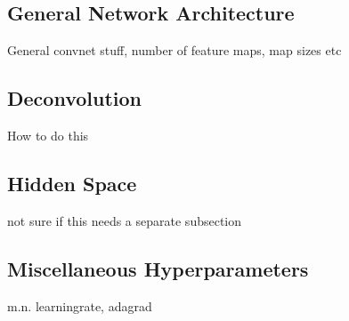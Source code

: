 \subsection{General Network Architecture}
General convnet stuff, number of feature maps, map sizes etc

\subsection{Deconvolution}
How to do this

\subsection{Hidden Space}
not sure if this needs a separate subsection

\subsection{Miscellaneous Hyperparameters}
m.n. learningrate, adagrad

\newpage